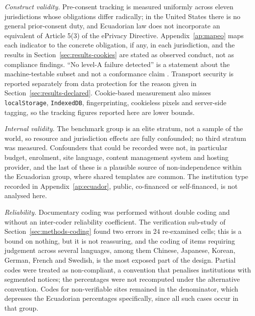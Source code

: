 \documentclass[pdflatex,sn-basic,Numbered]{sn-jnl}
\theoremstyle{thmstyleone}
\theoremstyle{thmstyletwo}
\theoremstyle{thmstylethree}
\begin{document}
\emph{Construct validity.} Pre-consent tracking is measured uniformly across eleven jurisdictions whose obligations differ radically; in the United States there is no general prior-consent duty, and Ecuadorian law does not incorporate an equivalent of Article 5(3) of the ePrivacy Directive. Appendix~\ref{ap:mapeo} maps each indicator to the concrete obligation, if any, in each jurisdiction, and the results in Section~\ref{sec:results-cookies} are stated as observed conduct, not as compliance findings. ``No level-A failure detected'' is a statement about the machine-testable subset and not a conformance claim \citep{fischer2025coverage}. Transport security is reported separately from data protection for the reason given in Section~\ref{sec:results-declared}. Cookie-based measurement also misses \verb|localStorage|, \verb|IndexedDB|, fingerprinting, cookieless pixels and server-side tagging, so the tracking figures reported here are lower bounds.

\emph{Internal validity.} The benchmark group is an elite stratum, not a sample of the world, so resource and jurisdiction effects are fully confounded; no third stratum was measured. Confounders that could be recorded were not, in particular budget, enrolment, site language, content management system and hosting provider, and the last of these is a plausible source of non-independence within the Ecuadorian group, where shared templates are common. The institution type recorded in Appendix~\ref{ap:ecuador}, public, co-financed or self-financed, is not analysed here.

\emph{Reliability.} Documentary coding was performed without double coding and without an inter-coder reliability coefficient. The verification sub-study of Section~\ref{sec:methods-coding} found two errors in 24 re-examined cells; this is a bound on nothing, but it is not reassuring, and the coding of items requiring judgement across several languages, among them Chinese, Japanese, Korean, German, French and Swedish, is the most exposed part of the design. Partial codes were treated as non-compliant, a convention that penalises institutions with segmented notices; the percentages were not recomputed under the alternative convention. Codes for non-verifiable sites remained in the denominator, which depresses the Ecuadorian percentages specifically, since all such cases occur in that group.
\end{document}
